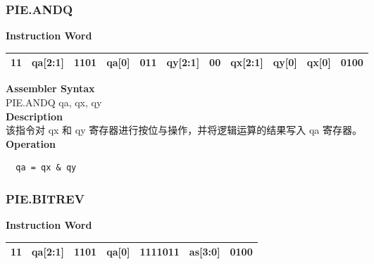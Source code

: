 \subsubsection{PIE.ANDQ}\label{instruction:PIEANDQ}
\setlength\tabcolsep{6pt}
\textbf{Instruction Word} \\
\begin{tabular}{|c|c|c|c|c|c|c|c|c|c|c|}
	\hline
	11 & qa[2:1] & 1101 & qa[0] & 011 & qy[2:1] & 00 & qx[2:1] & qy[0] & qx[0] & 0100 \\
	\hline
\end{tabular}

\textbf{Assembler Syntax} \\
PIE.ANDQ qa, qx, qy \\
\textbf{Description} \\
该指令对 qx 和 qy 寄存器进行按位与操作，并将逻辑运算的结果写入 qa 寄存器。\\
\textbf{Operation}
\begin{lstlisting}
  qa = qx & qy
\end{lstlisting}

\newpage
\subsubsection{PIE.BITREV}\label{instruction:PIEBITREV}
\setlength\tabcolsep{6pt}
\textbf{Instruction Word} \\
\begin{tabular}{|c|c|c|c|c|c|c|}
	\hline
	11 & qa[2:1] & 1101 & qa[0] & 1111011 & as[3:0] & 0100 \\
	\hline
\end{tabular}

